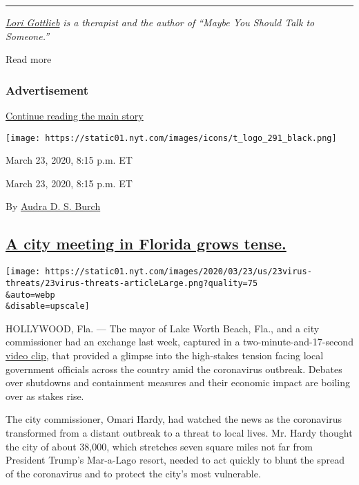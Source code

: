\begin{center}\rule{0.5\linewidth}{\linethickness}\end{center}

\href{https://lorigottlieb.com/}{\emph{Lori Gottlieb}} \emph{is a
therapist and the author of ``Maybe You Should Talk to Someone.''}

Read more

\hypertarget{advertisement}{%
\subsubsection{Advertisement}\label{advertisement}}

\protect\hyperlink{after-dfp-ad-mid1}{Continue reading the main story}

\texttt{[image: https://static01.nyt.com/images/icons/t\_logo\_291\_black.png]}

March 23, 2020, 8:15 p.m. ET

March 23, 2020, 8:15 p.m. ET

By \href{https://www.nytimes.com/by/audra-d-s-burch}{Audra D. S. Burch}

\hypertarget{a-city-meeting-in-florida-grows-tense}{%
\subsection{\texorpdfstring{\protect\hyperlink{a-city-meeting-in-florida-grows-tense}{A
city meeting in Florida grows
tense.}}{A city meeting in Florida grows tense.}}\label{a-city-meeting-in-florida-grows-tense}}

\texttt{[image: https://static01.nyt.com/images/2020/03/23/us/23virus-threats/23virus-threats-articleLarge.png?quality=75\\\&auto=webp\\\&disable=upscale]}

HOLLYWOOD, Fla. --- The mayor of Lake Worth Beach, Fla., and a city
commissioner had an exchange last week, captured in a
two-minute-and-17-second
\href{https://www.youtube.com/watch?v=2bgCCXSrwHA\&t=59s}{video clip},
that provided a glimpse into the high-stakes tension facing local
government officials across the country amid the coronavirus outbreak.
Debates over shutdowns and containment measures and their economic
impact are boiling over as stakes rise.

The city commissioner, Omari Hardy, had watched the news as the
coronavirus transformed from a distant outbreak to a threat to local
lives. Mr. Hardy thought the city of about 38,000, which stretches seven
square miles not far from President Trump's Mar-a-Lago resort, needed to
act quickly to blunt the spread of the coronavirus and to protect the
city's most vulnerable.


